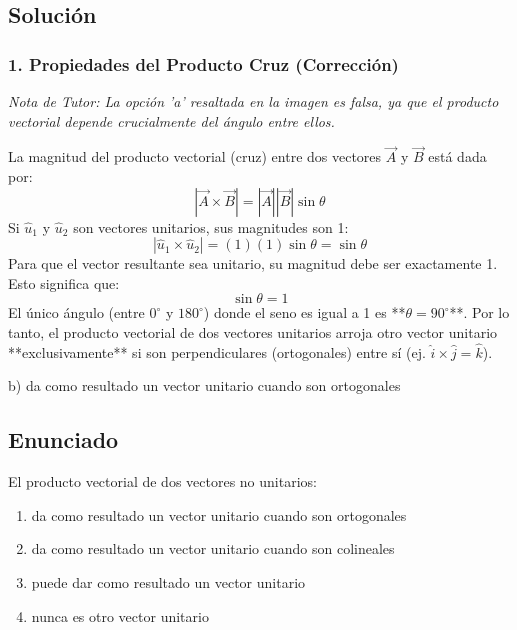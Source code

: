 \documentclass[12pt, a4paper]{article}
\begin{document}
\subsection*{Solución}

\subsubsection*{1. Propiedades del Producto Cruz (Corrección)}
\textit{Nota de Tutor: La opción 'a' resaltada en la imagen es falsa, ya que el producto vectorial depende crucialmente del ángulo entre ellos.}

La magnitud del producto vectorial (cruz) entre dos vectores $\vec{A}$ y $\vec{B}$ está dada por:
$$ |\vec{A} \times \vec{B}| = |\vec{A}| |\vec{B}| \sin\theta $$
Si $\hat{u}_1$ y $\hat{u}_2$ son vectores unitarios, sus magnitudes son 1:
$$ |\hat{u}_1 \times \hat{u}_2| = (1)(1)\sin\theta = \sin\theta $$
Para que el vector resultante sea unitario, su magnitud debe ser exactamente 1. Esto significa que:
$$ \sin\theta = 1 $$
El único ángulo (entre $0^\circ$ y $180^\circ$) donde el seno es igual a 1 es **$\theta = 90^\circ$**. Por lo tanto, el producto vectorial de dos vectores unitarios arroja otro vector unitario **exclusivamente** si son perpendiculares (ortogonales) entre sí (ej. $\hat{i} \times \hat{j} = \hat{k}$).

\begin{tcolorbox}[colback=green!5!white, colframe=green!50!black, title=Respuesta Final]
\centering \Large b) da como resultado un vector unitario cuando son ortogonales
\end{tcolorbox}

\newpage


\subsection*{Enunciado}
El producto vectorial de dos vectores no unitarios:
\begin{enumerate}[label=\alph*)]
    \item da como resultado un vector unitario cuando son ortogonales
    \item da como resultado un vector unitario cuando son colineales
    \item puede dar como resultado un vector unitario
    \item nunca es otro vector unitario
\end{enumerate}
\end{document}
